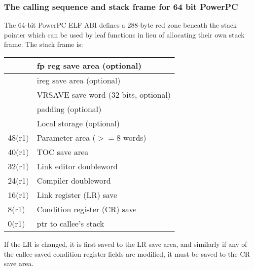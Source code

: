 \documentclass[11pt]{article}
\begin{document}
\subsubsection{The calling sequence and stack frame for 64 bit PowerPC}
The 64-bit PowerPC ELF ABI defines a 288-byte red zone beneath the stack
pointer which can be used by leaf functions in lieu of allocating their
own stack frame.  The stack frame is:
\begin{center}
\begin{tabular}{l|l}
       & fp reg save area (optional) \\\hline
       & ireg save area (optional) \\\hline
       & VRSAVE save word (32 bits, optional) \\\hline
       & padding (optional) \\\hline
       & Local storage (optional) \\\hline
48(r1) & Parameter area ($>= 8$ words) \\\hline
40(r1) & TOC save area \\\hline
32(r1) & Link editor doubleword \\\hline
24(r1) & Compiler doubleword \\\hline
16(r1) & Link register (LR) save \\\hline
 8(r1) & Condition register (CR) save \\\hline
 0(r1) & ptr to callee's stack \\\hline
\end{tabular}
\end{center}

If the LR is changed, it is first saved to the LR save area, and similarly
if any of the callee-saved condition register fields are modified, it must
be saved to the CR save area.
\end{document}
